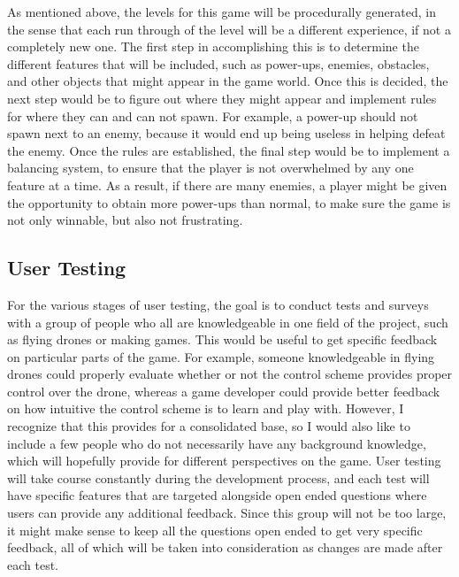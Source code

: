 \documentclass[10pt,twocolumn]{article}
\begin{document}
As mentioned above, the levels for this game will be procedurally generated, in the sense that each run through of the level will be a different experience, if not a completely new one. The first step in accomplishing this is to determine the different features that will be included, such as power-ups, enemies, obstacles, and other objects that might appear in the game world. Once this is decided, the next step would be to figure out where they might appear and implement rules for where they can and can not spawn. For example, a power-up should not spawn next to an enemy, because it would end up being useless in helping defeat the enemy. Once the rules are established, the final step would be to implement a balancing system, to ensure that the player is not overwhelmed by any one feature at a time. As a result, if there are many enemies, a player might be given the opportunity to obtain more power-ups than normal, to make sure the game is not only winnable, but also not frustrating.

\subsection{User Testing}
For the various stages of user testing, the goal is to conduct tests and surveys with a group of people who all are knowledgeable in one field of the project, such as flying drones or making games. This would be useful to get specific feedback on particular parts of the game. For example, someone knowledgeable in flying drones could properly evaluate whether or not the control scheme provides proper control over the drone, whereas a game developer could provide better feedback on how intuitive the control scheme is to learn and play with. However, I recognize that this provides for a consolidated base, so I would also like to include a few people who do not necessarily have any background knowledge, which will hopefully provide for different perspectives on the game. User testing will take course constantly during the development process, and each test will have specific features that are targeted alongside open ended questions where users can provide any additional feedback. Since this group will not be too large, it might make sense to keep all the questions open ended to get very specific feedback, all of which will be taken into consideration as changes are made after each test.
\end{document}
